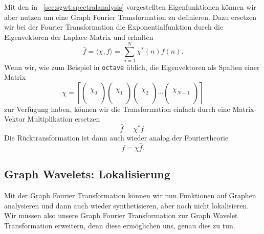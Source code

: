 Mit den in ~\cref{sec:sgwt:spectralanalysis} vorgestellten Eigenfunktionen 
k\"onnen wir aber nutzen um eine Graph Fourier Transformation zu definieren. 
Dazu ersetzen wir bei der Fourier Transformation die Exponentialfunktion durch 
die Eigenvektoren der Laplace-Matrix und erhalten
\begin{equation*}
\hat{f} = \langle \chi, f \rangle = \sum_{n = 1}^{N} \chi^*(n)f(n).
\end{equation*}
Wenn wir, wie zum Beispiel in \texttt{octave} \"ublich, die Eigenvektoren als 
Spalten einer Matrix
\begin{equation}
\chi = 
\left[
\begin{pmatrix}\\\chi_0\\\\\end{pmatrix}
\begin{pmatrix}\\\chi_1\\\\\end{pmatrix}
\begin{pmatrix}\\\chi_2\\\\\end{pmatrix}
\cdots
\begin{pmatrix}\\\chi_{N-1}\\\\\end{pmatrix}
\right]
\end{equation}
zur Verf\"ugung haben, k\"onnen wir die Transformation 
einfach durch eine Matrix-Vektor Multiplikation ersetzen
\begin{equation*}
\hat{f} = \chi^* f.
\end{equation*}
Die R\"ucktransformation ist dann auch wieder analog der Fouriertheorie
\begin{equation*}
f = \chi \hat{f}.
\end{equation*}

\subsection{Graph Wavelets: Lokalisierung\label{subsec:sgwt:gwt:localizing}}

Mit der Graph Fourier Transformation k\"onnen wir nun Funktionen auf Graphen 
analysieren und dann auch wieder synthetisieren, aber noch nicht 
lokalisieren. Wir m\"ussen also unsere Graph Fourier Transformation zur Graph 
Wavelet Transformation erweitern, denn diese erm\"oglichen uns, genau dies zu 
tun.

